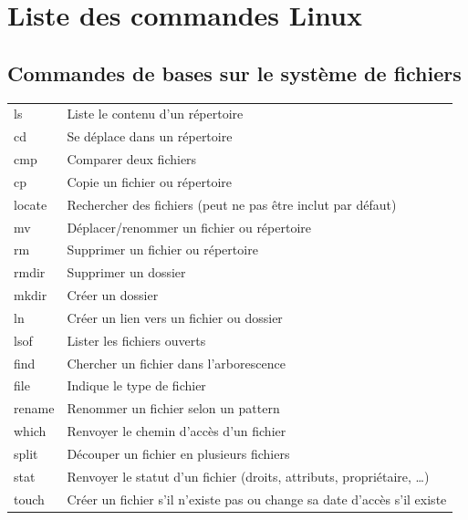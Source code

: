 \documentclass[a4paper, 11pt, french, oneside]{book}
\begin{document}
	\chapter{Liste des commandes Linux}
		\section{Commandes de bases sur le système de fichiers}
			\begin{tabular}{p{3cm}|p{11cm}}
		   		ls & Liste le contenu d’un répertoire\\
				cd	& Se déplace dans un répertoire\\
				cmp	& Comparer deux fichiers\\
				cp	& Copie un fichier ou répertoire\\
				locate & Rechercher des fichiers (peut ne pas être inclut par défaut)\\
				mv	& Déplacer/renommer un fichier ou répertoire\\
				rm	& Supprimer un fichier ou répertoire\\
				rmdir	& Supprimer un dossier\\
				mkdir	& Créer un dossier\\
				ln	& Créer un lien vers un fichier ou dossier\\
				lsof	& Lister les fichiers ouverts\\
				find	& Chercher un fichier dans l’arborescence\\
				file	& Indique le type de fichier\\
				rename	& Renommer un fichier selon un pattern\\
				which	& Renvoyer le chemin d’accès d’un fichier\\
				split	& Découper un fichier en plusieurs fichiers\\
				stat	& Renvoyer le statut d’un fichier (droits, attributs, propriétaire, …)\\
				touch	& Créer un fichier s’il n’existe pas ou change sa date d’accès s’il existe\\
			\end{tabular}
\end{document}
